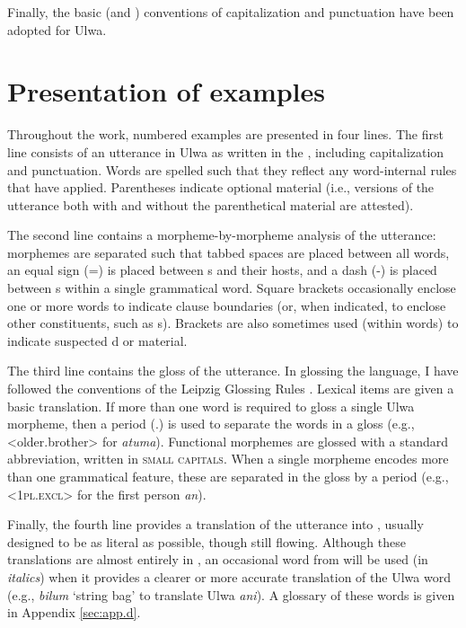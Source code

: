 Finally, the basic  (and ) conventions of capitalization and punctuation have been adopted for Ulwa.


\section{Presentation of examples}\label{sec:1.3}

Throughout the work, numbered examples are presented in four lines. The first line consists of an utterance in Ulwa as written in the , including capitalization and punctuation. Words are spelled such that they reflect any word-internal  rules that have applied. Parentheses indicate optional material (i.e., versions of the utterance both with and without the parenthetical material are attested).

The second line contains a morpheme-by-morpheme  analysis of the utterance: morphemes are separated such that tabbed spaces are placed between all  words, an equal sign (=) is placed between s and their hosts, and a dash (-) is placed between s within a single grammatical word. Square brackets occasionally enclose one or more words to indicate clause boundaries (or, when indicated, to enclose other constituents, such as s). Brackets are also sometimes used (within words) to indicate suspected d  or  material.

 The third line contains the  gloss of the utterance. In glossing the language, I have followed the conventions of the Leipzig Glossing Rules \citep{ComrieEtAl2008}. Lexical items are given a basic  translation. If more than one  word is required to gloss a single Ulwa morpheme, then a period (.) is used to separate the words in a gloss (e.g., <older.brother> for \textit{atuma}). Functional morphemes are glossed with a standard abbreviation, written in \textsc{small} \textsc{capitals}. When a single morpheme encodes more than one grammatical feature, these are separated in the gloss by a period (e.g., <1\textsc{pl.excl}> for the first person    \textit{an}).

Finally, the fourth line provides a translation of the utterance into , usually designed to be as literal as possible, though still flowing. Although these translations are almost entirely in , an occasional word from  will be used (in \textit{italics}) when it provides a clearer or more accurate translation of the Ulwa word (e.g.,  \textit{bilum} ‘string bag’ to translate Ulwa \textit{ani}). A glossary of these words is given in Appendix \ref{sec:app.d}.

